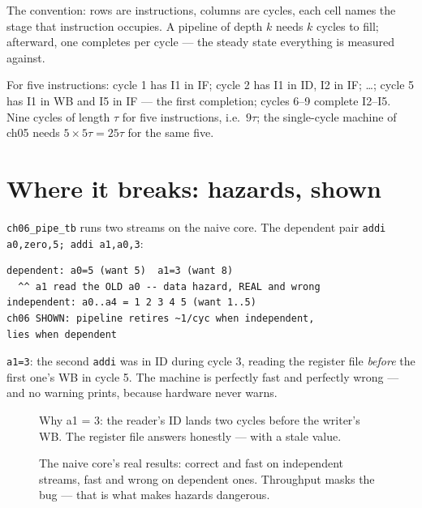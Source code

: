 The convention: rows are instructions, columns are cycles, each
cell names the stage that instruction occupies. A pipeline of depth
$k$ needs $k$ cycles to fill; afterward, one completes per cycle
--- the steady state everything is measured against.

\begin{example}\label{ex:fill06}
For five instructions: cycle 1 has I1 in IF; cycle 2 has I1 in ID,
I2 in IF; \ldots; cycle 5 has I1 in WB and I5 in IF --- the first
completion; cycles 6--9 complete I2--I5. Nine cycles of length $\tau$ for five
instructions, i.e.\ $9\tau$; the single-cycle machine of ch05 needs
$5\times5\tau=25\tau$ for the same five.
\end{example}

\section{Where it breaks: hazards, shown}
\label{sec:hazard06}

\begin{example}\label{ex:wrong06}
\texttt{ch06\_pipe\_tb} runs two streams on the naive core. The
dependent pair \texttt{addi a0,zero,5; addi a1,a0,3}:
\begin{lstlisting}
dependent: a0=5 (want 5)  a1=3 (want 8)
  ^^ a1 read the OLD a0 -- data hazard, REAL and wrong
independent: a0..a4 = 1 2 3 4 5 (want 1..5)
ch06 SHOWN: pipeline retires ~1/cyc when independent,
lies when dependent
\end{lstlisting}
\texttt{a1=3}: the second \texttt{addi} was in ID during cycle 3,
reading the register file \emph{before} the first one's WB in
cycle 5. The machine is perfectly fast and perfectly wrong ---
and no warning prints, because hardware never warns.
\end{example}

\begin{figure}[t]
\centering

\caption[Data hazard timing]{Why a1 = 3: the reader's ID lands
two cycles before the writer's WB. The register file answers
honestly --- with a stale value.}
\label{fig:hazard06}
\end{figure}

\begin{figure}[t]
\centering

\caption[Measured CPI outcome]{The naive core's real results:
correct and fast on independent streams, fast and wrong on
dependent ones. Throughput masks the bug --- that is what makes
hazards dangerous.}
\label{fig:cpi06}
\end{figure}


